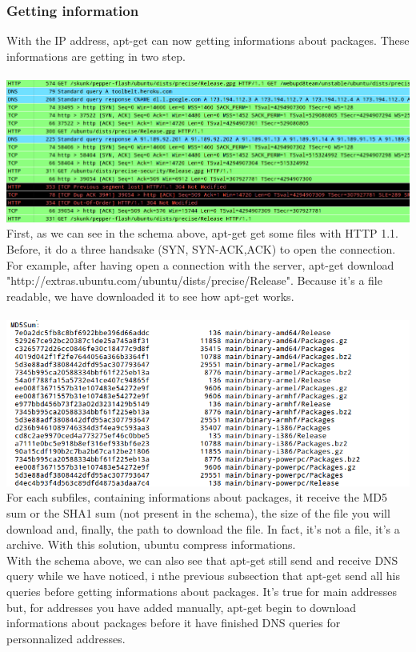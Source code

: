 \documentclass[twoside]{article}
\begin{document}
\begin{multicols}{2}
\subsubsection{Getting information}
With the IP address, apt-get can now getting informations about packages.  These informations are getting in two step.\\ \\ \includegraphics[scale=0.2]{pictures/update_get_1.png}
First, as we can see in the schema above, apt-get get some files with HTTP 1.1.  Before, it do a three handsake (SYN, SYN-ACK,ACK) to open the connection.  For example, after having open a connection with the server, apt-get download "http://extras.ubuntu.com/ubuntu/dists/precise/Release".  Because it's a file readable, we have downloaded it to see how apt-get works.\\ \\ \includegraphics[scale=0.3]{pictures/update_first_file.png}
For each subfiles, containing informations about packages, it receive the MD5 sum or the SHA1 sum (not present in the schema), the size of the file you will download and, finally, the path to download the file.  In fact, it's not a file, it's a archive.  With this solution, ubuntu compress informations.\\
With the schema above, we can also see that apt-get still send and receive DNS query while we have noticed, i nthe previous subsection that apt-get send all his queries before getting informations about packages.  It's true for main addresses but, for addresses you have added manually, apt-get begin to download informations about packages before it have finished DNS queries for personnalized addresses.\\

\end{multicols}
\end{document}
